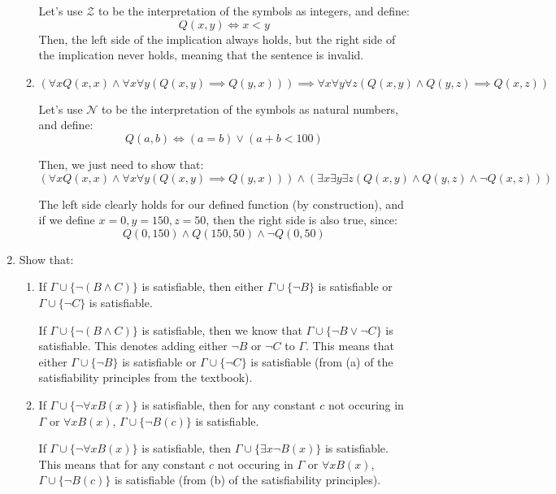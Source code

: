 \begin{enumerate}
\begin{enumerate}
        Let's use $\mathcal{Z}$ to be the interpretation of the symbols as integers, and define:
        $$Q(x,y) \iff x < y$$
        Then, the left side of the implication always holds, but the right side of the implication never holds, meaning that the sentence is invalid.
      \item 
        \begin{question}
          $$(\forall x Q(x,x) \land \forall x \forall y (Q(x,y) \implies Q(y,x))) \implies \forall x \forall y \forall z (Q(x,y) \land Q(y,z) \implies Q(x,z))$$
        \end{question}

        Let's use $\mathcal{N}$ to be the interpretation of the symbols as natural numbers, and define:
        $$Q(a,b) \iff (a=b) \lor (a+b < 100)$$

        Then, we just need to show that:
        $$(\forall x Q(x,x) \land \forall x \forall y (Q(x,y) \implies Q(y,x))) \land (\exists x \exists y \exists z (Q(x,y) \land Q(y,z) \land \neg Q(x,z)))$$

        The left side clearly holds for our defined function (by construction), and if we define $x=0, y=150, z=50$, then the right side is also true, since:
        $$Q(0,150) \land Q(150,50) \land \neg Q(0,50)$$

    \end{enumerate}

  \item 
    Show that:

    \begin{enumerate}
      \item
        \begin{question}
          If $\Gamma \cup \{\neg (B \land C)\}$ is satisfiable, then either $\Gamma \cup \{\neg B \}$ is satisfiable or $\Gamma \cup \{\neg C\}$ is satisfiable.
        \end{question}

        If $\Gamma \cup \{\neg (B \land C)\}$ is satisfiable, then we know that $\Gamma \cup \{\neg B \lor \neg C\}$ is satisfiable. This denotes adding either $\neg B$ or $\neg C$ to $\Gamma$. This means that either $\Gamma \cup \{\neg B \}$ is satisfiable or $\Gamma \cup \{\neg C\}$ is satisfiable (from (a) of the satisfiability principles from the textbook).

      \item
        \begin{question}
          If $\Gamma \cup \{\neg \forall x B(x) \}$ is satisfiable, then for any constant $c$ not occuring in $\Gamma$ or $\forall x B(x)$, $\Gamma \cup \{\neg B(c)\}$ is satisfiable.
        \end{question}

         If $\Gamma \cup \{\neg \forall x B(x) \}$ is satisfiable, then $\Gamma \cup \{\exists x \neg B(x) \}$ is satisfiable. This means that for any constant $c$ not occuring in $\Gamma$ or $\forall x B(x)$, $\Gamma \cup \{\neg B(c)\}$ is satisfiable (from (b) of the satisfiability principles).
    \end{enumerate}
\end{enumerate}

